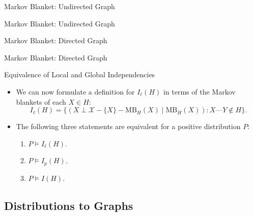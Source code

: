 \documentclass[11pt]{beamer}
\begin{document}
\begin{frame}{Markov Blanket: Undirected Graph}
\vspace{0pt}
\centering
\begin{figure}[!t]
\undirectedmb
\end{figure}
\end{frame}

\begin{frame}{Markov Blanket: Undirected Graph}
\vspace{0pt}
\centering
\begin{figure}[!t]
\undirectedmbsolved
\end{figure}
\end{frame}

\begin{frame}{Markov Blanket: Directed Graph}
\vspace{0pt}
\centering
\begin{figure}[!t]
\directedmb
\end{figure}
\end{frame}

\begin{frame}{Markov Blanket: Directed Graph}
\vspace{0pt}
\centering
\begin{figure}[!t]
\directedmbsolved
\end{figure}
\end{frame}

\begin{frame}{Equivalence of Local and Global Independencies}
\begin{itemize}
	\item We can now formulate a definition for $I_{\ell}(H)$ in terms of
	the Markov blankets of each $X \in H$:
	\[
		I_{\ell}(H) = \{(X \perp \mathcal{X} - \{X\} - \text{MB}_{H}(X)
		\;|\; \text{MB}_{H}(X)) : X \text{---} Y \notin H\}.
	\]
	\item The following three statements are equivalent for a positive
	distribution $P$:
	\begin{enumerate}
		\item $P \models I_{\ell}(H)$.
		\item $P \models I_{p}(H)$.
		\item $P \models I(H)$.
	\end{enumerate}
\end{itemize}
\end{frame}

\subsection{Distributions to Graphs}
\end{document}
